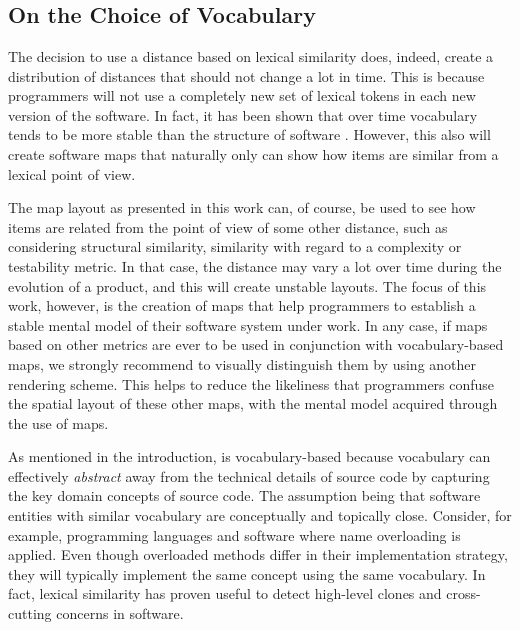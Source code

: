 \chapter{\SOCA}


\section{On the Choice of Vocabulary}

The decision to use a distance based on lexical similarity does, indeed, create a distribution of distances that should not change a lot in time. This is because programmers will not use a completely new set of lexical tokens in each new version of the software. In fact, it has been shown that over time vocabulary tends to be more stable than the structure of software \cite{Anto07a}. However, this also will create software maps that naturally only can show how items are similar from a lexical point of view.

The map layout as presented in this work can, of course, be used to see how items are related from the point of view of some other distance, such as considering structural similarity, similarity with regard to a complexity or testability metric. In that case, the distance may vary a lot over time during the evolution of a product, and this will create unstable layouts. The focus of this work, however, is the creation of maps that help programmers to establish a stable mental model of their software system under work. In any case, if maps  based on other metrics are ever to be used in conjunction with vocabulary-based \SOCA maps, we strongly recommend to visually distinguish them by using another rendering scheme. This helps to reduce the likeliness that programmers confuse the spatial layout of these other maps, with the mental model acquired through the use of \SOCA maps. 

As mentioned in the introduction, \SOCA is vocabulary-based because vocabulary can effectively \emph{abstract} away from the technical details of source code \cite{Kuhn07a} by capturing the key domain concepts of source code. The assumption being that software entities with similar vocabulary are conceptually and topically close. Consider, for example, programming languages and software where name overloading is applied. Even though overloaded methods differ in their implementation strategy, they will typically implement the same concept using the same vocabulary. In fact, lexical similarity has proven useful to detect high-level clones \cite{Marc01a} and cross-cutting concerns \cite{Pali08a} in software.  

